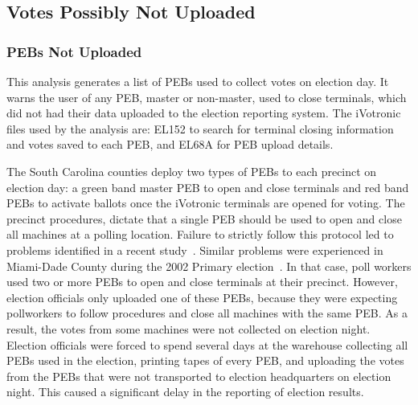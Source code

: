 \subsection{Votes Possibly Not Uploaded}
\subsubsection{PEBs Not Uploaded}
This analysis generates a list of PEBs used to collect votes on election day. It warns the user of any PEB, master or non-master, used to close terminals, which did not had their data uploaded to the election reporting system.  The iVotronic files used by the analysis are: EL152 to search for terminal closing information and votes saved to each PEB, and EL68A for PEB upload details.

The South Carolina counties deploy two types of PEBs to each precinct on election day: a green band master PEB to open and close terminals and red band PEBs to activate ballots once the iVotronic terminals are opened for voting. The precinct procedures, dictate that a single PEB should be used to open and close all machines at a polling location. Failure to strictly follow this protocol led to problems identified in a recent study~\cite{Buell2011}.  Similar problems were experienced in Miami-Dade County during the 2002 Primary election~\cite{Mazella2002}. In that case, poll workers used two or more PEBs to open and close terminals at their precinct.  However, election officials only uploaded one of these PEBs, because they were expecting pollworkers to follow procedures and close all machines with the same PEB. As a result, the votes from some machines were not collected on election night.  Election officials were forced to spend several days at the warehouse collecting all PEBs used in the election, printing tapes of every PEB, and uploading the votes from the PEBs that were not transported to election headquarters on election night. This caused a significant delay in the reporting of election results. 

